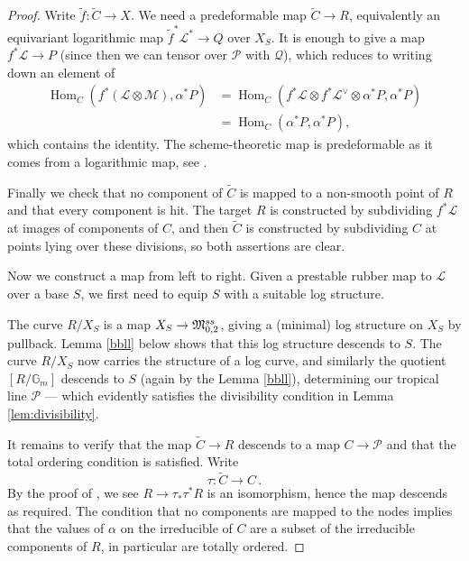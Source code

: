 \documentclass[a4paper,12pt]{article} %
\newcommand{\MWvone}[1]{}%
\newcommand{\MWref}[1]{#1}
\newcommand{\on}[1]{\operatorname{#1}}
\newcommand{\bb}[1]{{\mathbb{#1}}}
\newcommand{\ca}[1]{{\mathcal{#1}}}
\def\D{\mathrm{D}}
\def\D{\mathsf{D}}
\theoremstyle{definition}
\theoremstyle{plain}%
\begin{document}
\begin{proof}
Write $\tilde f\colon \tilde C \to X$. 
We need a predeformable map $\tilde C \to R$, equivalently an equivariant logarithmic map $\tilde f^* {\ca L}^* \to Q$ over $X_S$. It is enough to give a map $f^*\ca L \to P$ (since then we can tensor over $\ca P$ with $\ca Q$), which reduces to writing down an element of 
\begin{equation}
\begin{split}
\on{Hom}_C(f^*(\ca L \otimes \ca M), \alpha^*P) &= 
\on{Hom}_C(f^*\ca L \otimes f^*\ca L^\vee \otimes \alpha^*P, \alpha^*P)\\
& = \on{Hom}_C(\alpha^*P, \alpha^*P), 
\end{split}
\end{equation}
which contains the identity. The scheme-theoretic map is predeformable as it comes from a logarithmic map, see \cite{BumsigKim2008LOGARITHMICSTABLEMAPS}. 



Finally we check that no component of $\tilde C$ is mapped to a non-smooth point of $R$ and that every component is hit. The target $R$ is  constructed by subdividing $f^*\ca L$ at images of components of $C$, and then $\tilde C$ is constructed by subdividing $C$ at points lying over these divisions, so both assertions are clear. %

Now we construct a map from left to right. Given a prestable rubber map to $\ca L$ over a base $S$, we first need to equip $S$ with a suitable log structure. 

The curve $R/X_S$ is a map $X_S \to \frak M_{0,2}^{ss}$, giving a (minimal) log structure on $X_S$ by pullback.
Lemma \ref{bbll} below shows that this log structure descends to $S$. The curve $R/X_S$ now carries the structure of a log curve, and similarly the quotient $[R/\bb G_m]$ descends to $S$ (again by the Lemma \ref{bbll}), determining our tropical line $\ca P$ --- which evidently satisfies the divisibility condition in Lemma \ref{lem:divisibility}.  

It remains to verify that the map $\tilde C \to R$ descends to a map $C \to \ca P$ 
and that the total ordering condition is satisfied. Write
$$\tau\colon \tilde C \to C\, .$$ 
By the proof of \cite[\MWref{Proposition 5.5.2}\MWvone{Proposition 5.14}]{Marcus2017Logarithmic-com},
we see $R \to \tau_*\tau^*R$ is an isomorphism, hence the map descends as required. The condition that no components are mapped to the nodes implies that the values of $\alpha$ on the irreducible of $C$ are a subset of the irreducible components of $R$, in particular are totally ordered. 
\end{proof}
\end{document}
